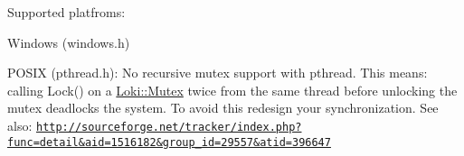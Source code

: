 \begin{DoxyParagraph}{Supported platfroms\+:}

\end{DoxyParagraph}

\begin{DoxyItemize}
\item Windows (windows.\+h)
\item P\+O\+S\+I\+X (pthread.\+h)\+: No recursive mutex support with pthread. This means\+: calling Lock() on a \hyperlink{classLoki_1_1Mutex}{Loki\+::\+Mutex} twice from the same thread before unlocking the mutex deadlocks the system. To avoid this redesign your synchronization. See also\+: \href{http://sourceforge.net/tracker/index.php?func=detail&aid=1516182&group_id=29557&atid=396647}{\tt http\+://sourceforge.\+net/tracker/index.\+php?func=detail\&aid=1516182\&group\+\_\+id=29557\&atid=396647} 
\end{DoxyItemize}